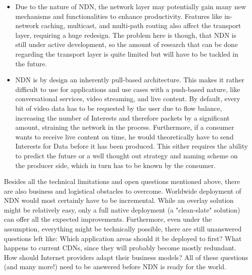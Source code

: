\begin{itemize}
	\item Due to the nature of NDN, the network layer may potentially gain many new mechanisms and functionalities to enhance productivity. Features like in-network caching, multicast, and multi-path routing also affect the transport layer, requiring a huge redesign. The problem here is though, that NDN is still under active development, so the amount of research that can be done regarding the transport layer is quite limited but will have to be tackled in the future.
	
	\item NDN is by design an inherently pull-based architecture. This makes it rather difficult to use for applications and use cases with a push-based nature, like conversational services, video streaming, and live content. By default, every bit of video data has to be requested by the user due to flow balance, increasing the number of Interests and therefore packets by a significant amount, straining the network in the process. Furthermore, if a consumer wants to receive live content on time, he would theoretically have to send Interests for Data before it has been produced. This either requires the ability to predict the future or a well thought out strategy and naming scheme on the producer side, which in turn has to be known by the consumer.
	
	
	
\end{itemize}

Besides all the technical limitations and open questions mentioned above, there are also business and logistical obstacles to overcome. Worldwide deployment of NDN would most certainly have to be incremental. While an overlay solution might be relatively easy, only a full native deployment (a "clean-slate" solution) can offer all the expected improvements. Furthermore, even under the assumption, everything might be technically possible, there are still unanswered questions left like: Which application areas should it be deployed to first? What happens to current CDNs, since they will probably become mostly redundant. How should Internet providers adapt their business models? All of these questions (and many more!) need to be answered before NDN is ready for the world. 
\cite{XVSF+13}


